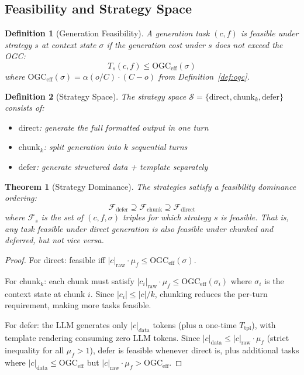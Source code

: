 \documentclass[11pt,twocolumn]{article}
\newtheorem{definition}{Definition}
\newtheorem{theorem}{Theorem}
\newcommand{\ogceff}{\mathrm{OGC}_{\mathrm{eff}}}
\begin{document}
\subsection{Feasibility and Strategy Space}

\begin{definition}[Generation Feasibility]
\label{def:feasible}
A generation task $(c, f)$ is \emph{feasible} under strategy $s$
at context state $\sigma$ if the generation cost under $s$ does
not exceed the OGC:
\begin{equation}
T_s(c, f) \leq \ogceff(\sigma)
\end{equation}
where $\ogceff(\sigma) = \alpha(o/C) \cdot (C - o)$ from
Definition~\ref{def:ogc}.
\end{definition}

\begin{definition}[Strategy Space]
\label{def:strategies}
The strategy space $\mathcal{S} = \{\text{direct}, \text{chunk}_k,
\text{defer}\}$ consists of:
\begin{itemize}[leftmargin=*,itemsep=1pt]
  \item $\text{direct}$: generate the full formatted output in one turn
  \item $\text{chunk}_k$: split generation into $k$ sequential turns
  \item $\text{defer}$: generate structured data + template separately
\end{itemize}
\end{definition}

\begin{theorem}[Strategy Dominance]
\label{thm:dominance}
The strategies satisfy a \emph{feasibility dominance} ordering:
\begin{equation}
\mathcal{F}_{\text{defer}} \supseteq \mathcal{F}_{\text{chunk}} \supseteq \mathcal{F}_{\text{direct}}
\end{equation}
where $\mathcal{F}_s$ is the set of $(c, f, \sigma)$ triples for
which strategy $s$ is feasible.  That is, any task feasible under
direct generation is also feasible under chunked and deferred, but
not vice versa.
\end{theorem}

\begin{proof}
For direct: feasible iff $|c|_{\text{raw}} \cdot \mu_f \leq \ogceff(\sigma)$.

For chunk$_k$: each chunk must satisfy
$|c_i|_{\text{raw}} \cdot \mu_f \leq \ogceff(\sigma_i)$ where
$\sigma_i$ is the context state at chunk $i$.  Since
$|c_i| \leq |c|/k$, chunking reduces the per-turn requirement,
making more tasks feasible.

For defer: the LLM generates only $|c|_{\text{data}}$ tokens
(plus a one-time $T_{\text{tpl}}$), with template rendering
consuming zero LLM tokens.  Since $|c|_{\text{data}} \leq
|c|_{\text{raw}} \cdot \mu_f$ (strict inequality for all
$\mu_f > 1$), defer is feasible whenever direct is, plus
additional tasks where $|c|_{\text{data}} \leq \ogceff$ but
$|c|_{\text{raw}} \cdot \mu_f > \ogceff$.
\end{proof}
\end{document}
